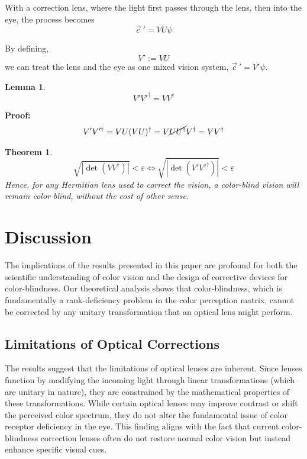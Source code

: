 \documentclass[10pt,a4paper]{article}
\newtheorem{thm}{Theorem} [section]
\newtheorem{lem}{Lemma}[section]
\theoremstyle{definition}
\theoremstyle{remark}
\numberwithin{equation}{section}
\newcommand{\abs}[1]{\left\vert#1\right\vert}
\newcommand{\eps}{\varepsilon}
\newcommand{\pdet}[1]{            \sqrt{\abs{   \det    \left(#1 #1^\dagger \right)   }}               }
\begin{document}
With a correction lens, where the light first passes through the lens, then into the eye, the process becomes
\begin{equation}
\vec{c}~' = V U \psi 
\end{equation}

By defining, 
\begin{equation}
V':=VU
\end{equation}
we can treat the lens and the eye as one mixed vision system, $\vec{c}~' = V' \psi $.

\begin{lem}
\begin{equation}
V' V'^\dagger = V V^\dagger 
\end{equation}
\end{lem}
\textbf{Proof:} 
\begin{eqnarray}
V' V'^\dagger = VU (VU)^\dagger 
                      =  V \cancel{ U U^\dagger } V^\dagger 
                      =  V V^\dagger 
\end{eqnarray}

\begin{thm}
\begin{equation}
\pdet{V} < \eps \iff  \pdet{V'} < \eps
\end{equation}
Hence, for any Hermitian lens used to correct the vision, a color-blind vision will remain color blind, without the cost of other sense. 
\end{thm}

\section{Discussion}

The implications of the results presented in this paper are profound for both the scientific understanding of color vision and the design of corrective devices for color-blindness. Our theoretical analysis shows that color-blindness, which is fundamentally a rank-deficiency problem in the color perception matrix, cannot be corrected by any unitary transformation that an optical lens might perform.

\subsection{Limitations of Optical Corrections}
The results suggest that the limitations of optical lenses are inherent. Since lenses function by modifying the incoming light through linear transformations (which are unitary in nature), they are constrained by the mathematical properties of these transformations. While certain optical lenses may improve contrast or shift the perceived color spectrum, they do not alter the fundamental issue of color receptor deficiency in the eye. This finding aligns with the fact that current color-blindness correction lenses often do not restore normal color vision but instead enhance specific visual cues.
\end{document}
